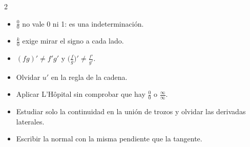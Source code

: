 \documentclass[10pt]{article}
\begin{document}
\begin{multicols}{2}
\begin{ojo}
\begin{itemize}
  \item \(\frac00\) no vale 0 ni 1: es una indeterminación.
  \item \(\frac k0\) exige mirar el signo a cada lado.
  \item \((fg)'\ne f'g'\) y \(\bigl(\frac fg\bigr)'\ne\frac{f'}{g'}\).
  \item Olvidar \(u'\) en la regla de la cadena.
  \item Aplicar L'Hôpital sin comprobar que hay \(\frac00\) o \(\frac\infty\infty\).
  \item Estudiar solo la continuidad en la unión de trozos y olvidar las derivadas laterales.
  \item Escribir la normal con la misma pendiente que la tangente.
\end{itemize}
\end{ojo}

\end{multicols}
\end{document}
